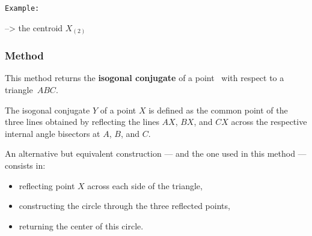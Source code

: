 \texttt{Example:}
\begin{mybox}
 \quad --> the centroid $X_{(2)}$
\end{mybox}

\vspace{1em}

\begin{tkzexample}[latex=.5\textwidth]
\begin{center}
\end{center}
\end{tkzexample}

\subsubsection{Method } %
\label{ssub:method_triangle_isogonal}

This method returns the \textbf{isogonal conjugate} of a point~ with respect to a triangle~$ABC$.

\medskip

The isogonal conjugate $Y$ of a point $X$ is defined as the common point of the three lines obtained by reflecting the lines $AX$, $BX$, and $CX$ across the respective internal angle bisectors at $A$, $B$, and $C$.

\medskip

An alternative but equivalent construction — and the one used in this method — consists in:
\begin{itemize}
  \item reflecting point $X$ across each side of the triangle,
  \item constructing the circle through the three reflected points,
  \item returning the center of this circle.
\end{itemize}

